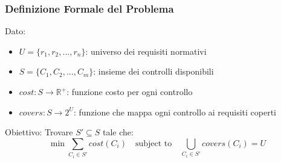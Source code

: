 \subsubsection{Definizione Formale del Problema}

Dato:
\begin{itemize}
    \item $U = \{r_1, r_2, ..., r_n\}$: universo dei requisiti normativi
    \item $S = \{C_1, C_2, ..., C_m\}$: insieme dei controlli disponibili
    \item $cost: S \rightarrow \mathbb{R}^+$: funzione costo per ogni controllo
    \item $covers: S \rightarrow 2^U$: funzione che mappa ogni controllo ai requisiti coperti
\end{itemize}

Obiettivo: Trovare $S' \subseteq S$ tale che:
\begin{equation}
    \min \sum_{C_i \in S'} cost(C_i) \quad \text{subject to} \quad \bigcup_{C_i \in S'} covers(C_i) = U
\end{equation}




    
        
    

